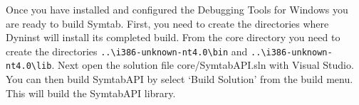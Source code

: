 Once you have installed and configured the Debugging Tools for Windows
you are ready to build Symtab. First, you need to create the directories where
Dyninst will install its completed build. From the core directory you need to
create the directories \texttt{..\textbackslash i386-unknown-nt4.0\textbackslash bin} and
\texttt{..\textbackslash i386-unknown-nt4.0\textbackslash lib}.
Next open the solution file core/SymtabAPI.sln with Visual Studio.   You can
then build SymtabAPI by select `Build Solution' from the build menu. This
will build the SymtabAPI library.

